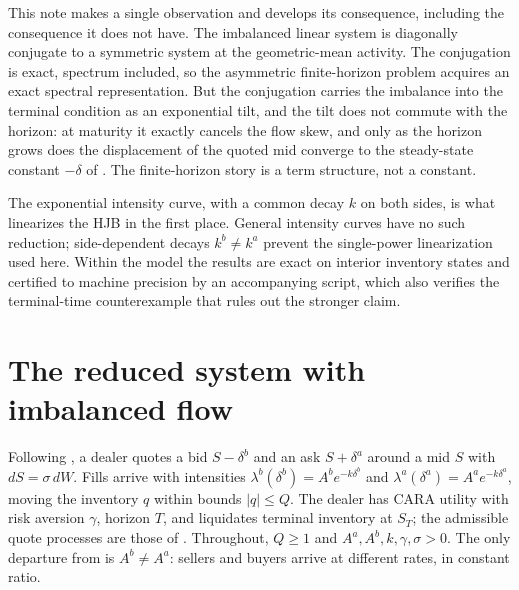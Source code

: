 \documentclass[11pt]{article}
\begin{document}
This note makes a single observation and develops its consequence, including the consequence it does not have. The imbalanced linear system is diagonally conjugate to a symmetric system at the geometric-mean activity. The conjugation is exact, spectrum included, so the asymmetric finite-horizon problem acquires an exact spectral representation. But the conjugation carries the imbalance into the terminal condition as an exponential tilt, and the tilt does not commute with the horizon: at maturity it exactly cancels the flow skew, and only as the horizon grows does the displacement of the quoted mid converge to the steady-state constant $-\delta$ of \citet{cotton2026skew}. The finite-horizon story is a term structure, not a constant.

The exponential intensity curve, with a common decay $k$ on both sides, is what linearizes the HJB in the first place. General intensity curves have no such reduction; side-dependent decays $k^b \neq k^a$ prevent the single-power linearization used here. Within the model the results are exact on interior inventory states and certified to machine precision by an accompanying script, which also verifies the terminal-time counterexample that rules out the stronger claim.

\section{The reduced system with imbalanced flow}\label{sec:model}

Following \citet{glft2012}, a dealer quotes a bid $S - \delta^b$ and an ask $S + \delta^a$ around a mid $S$ with $dS = \sigma\, dW$. Fills arrive with intensities $\lambda^b(\delta^b) = A^b e^{-k\delta^b}$ and $\lambda^a(\delta^a) = A^a e^{-k\delta^a}$, moving the inventory $q$ within bounds $|q| \le Q$. The dealer has CARA utility with risk aversion $\gamma$, horizon $T$, and liquidates terminal inventory at $S_T$; the admissible quote processes are those of \citet{glft2012}. Throughout, $Q \ge 1$ and $A^a, A^b, k, \gamma, \sigma > 0$. The only departure from \citet{glft2012} is $A^b \neq A^a$: sellers and buyers arrive at different rates, in constant ratio.
\end{document}
